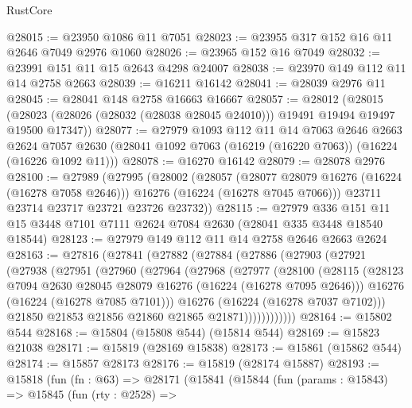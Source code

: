 \begin{lexlean}{RustCore}
\begin{coremodule}
@28015 := @23950 @1086 @11 @7051
@28023 := @23955 @317 @152 @16 @11 @2646 @7049 @2976 @1060
@28026 := @23965 @152 @16 @7049
@28032 := @23991 @151 @11 @15 @2643 @4298 @24007
@28038 := @23970 @149 @112 @11 @14 @2758 @2663
@28039 := @16211 @16142
@28041 := @28039 @2976 @11
@28045 := @28041 @148 @2758 @16663 @16667
@28057 := @28012
    (@28015 (@28023 (@28026 (@28032 (@28038 @28045 @24010))) @19491 @19494 @19497 @19500 @17347))
@28077 := @27979
    @1093
    @112
    @11
    @14
    @7063
    @2646
    @2663
    @2624
    @7057
    @2630
    (@28041 @1092 @7063 (@16219 (@16220 @7063)) (@16224 (@16226 @1092 @11)))
@28078 := @16270 @16142
@28079 := @28078 @2976
@28100 := @27989
    (@27995
      (@28002
        (@28057
          (@28077 @28079 @16276 (@16224 (@16278 @7058 @2646)))
          @16276
          (@16224 (@16278 @7045 @7066)))
        @23711
        @23714
        @23717
        @23721
        @23726
        @23732))
@28115 := @27979
    @336
    @151
    @11
    @15
    @3448
    @7101
    @7111
    @2624
    @7084
    @2630
    (@28041 @335 @3448 @18540 @18544)
@28123 := @27979 @149 @112 @11 @14 @2758 @2646 @2663 @2624
@28163 := @27816
    (@27841
      (@27882
        (@27884
          (@27886
            (@27903
              (@27921
                (@27938
                  (@27951
                    (@27960
                      (@27964
                        (@27968
                          (@27977
                            (@28100
                              (@28115
                                (@28123
                                  @7094
                                  @2630
                                  @28045
                                  @28079
                                  @16276
                                  (@16224 (@16278 @7095 @2646)))
                                @16276
                                (@16224 (@16278 @7085 @7101)))
                              @16276
                              (@16224 (@16278 @7037 @7102)))
                            @21850
                            @21853
                            @21856
                            @21860
                            @21865
                            @21871))))))))))))
@28164 := @15802 @544
@28168 := @15804 (@15808 @544) (@15814 @544)
@28169 := @15823 @21038
@28171 := @15819 (@28169 @15838)
@28173 := @15861 (@15862 @544)
@28174 := @15857 @28173
@28176 := @15819 (@28174 @15887)
@28193 := @15818
    (fun (fn : @63) =>
    @28171
      (@15841
        (@15844
          (fun (params : @15843) =>
          @15845
            (fun (rty : @2528) =>

\end{coremodule}
\end{lexlean}
